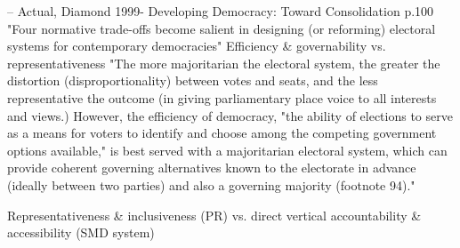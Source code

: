 \documentclass{article}
\begin{document}
--
Actual, Diamond 1999- Developing Democracy: Toward Consolidation p.100
"Four normative trade-offs become salient in designing (or reforming) electoral systems for contemporary democracies"
Efficiency \& governability vs. representativeness
"The more majoritarian the electoral system, the greater the distortion (disproportionality) between votes and seats, and the less representative the outcome (in giving parliamentary place voice to all interests and views.) However, the efficiency of democracy, "the ability of elections to serve as a means for voters to identify and choose among the competing government options available," is best served with a majoritarian electoral system, which can provide coherent governing alternatives known to the electorate in advance (ideally between two parties) and also a governing majority (footnote 94)."

Representativeness \& inclusiveness (PR) vs. direct vertical accountability \& accessibility (SMD system)

\fi
\end{document}
